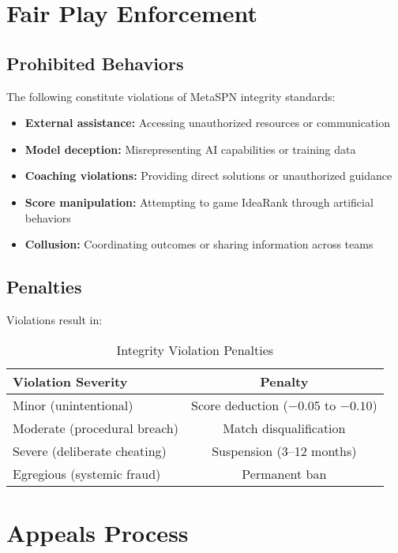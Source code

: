 \section{Fair Play Enforcement}

\subsection{Prohibited Behaviors}

The following constitute violations of MetaSPN integrity standards:
\begin{itemize}[leftmargin=*]
  \item \textbf{External assistance:} Accessing unauthorized resources or communication
  \item \textbf{Model deception:} Misrepresenting AI capabilities or training data
  \item \textbf{Coaching violations:} Providing direct solutions or unauthorized guidance
  \item \textbf{Score manipulation:} Attempting to game IdeaRank through artificial behaviors
  \item \textbf{Collusion:} Coordinating outcomes or sharing information across teams
\end{itemize}

\subsection{Penalties}

Violations result in:

\begin{table}[h]
\centering
\begin{tabular}{@{}lc@{}}
\toprule
\textbf{Violation Severity} & \textbf{Penalty} \\ \midrule
Minor (unintentional) & Score deduction ($-0.05$ to $-0.10$) \\
Moderate (procedural breach) & Match disqualification \\
Severe (deliberate cheating) & Suspension (3–12 months) \\
Egregious (systemic fraud) & Permanent ban \\ \bottomrule
\end{tabular}
\caption{Integrity Violation Penalties}
\label{tab:integrity_penalties}
\end{table}

\section{Appeals Process}

